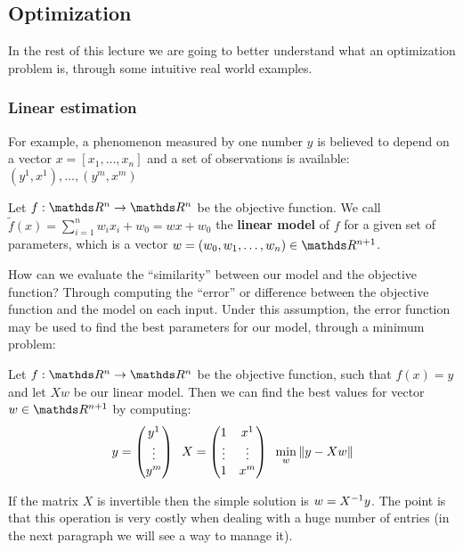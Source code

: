 \documentclass[ComputationalMathematics.tex]{subfiles}
\begin{document}
\subsection{Optimization}

In the rest of this lecture we are going to better understand what an optimization problem is, through some intuitive real world examples.

\subsubsection{Linear estimation}
For example, a phenomenon measured by one number $y$ is believed to depend on a vector $x = [x_1, \dots, x_n]$ and a set of observations is available: $(y^1,x^1), \dots, (y^m,x^m)$ 
\begin{definition}
  Let $f: \R^n \to \R^n$ be the objective function. We call $\widetilde{f}(x) = \sum_{i = 1}^n w_i x_i + w_0 = w x + w_0$ the \textbf{linear model} of $f$ for a given set of parameters, which is a vector $w = (w_0, w_1, \ldots, w_n) \in \R^{n+1}$.
\end{definition}

How can we evaluate the ``similarity'' between our model and the objective function? Through computing the ``error'' or difference between the objective function and the model on each input.
Under this assumption, the error function may be used to find the best parameters for our model, through a minimum problem:

\begin{definition}
  Let $f: \R^n \to \R^n$ be the objective function, such that $f(x) = y$ and let $Xw$ be our linear model. Then we can find the best values for vector $w \in \R^{n+1}$ by computing:
\[
  y = \begin{pmatrix} y^1\\ \vdots\\ y^m \end{pmatrix} \; \; X = \begin{pmatrix} 1 & x^1\\ \vdots & \vdots\\ 1 & x^m \end{pmatrix}\; \; \min_{w} \left\lVert y - X w\right\rVert
\]
\end{definition}

If the matrix $X$ is invertible then the simple solution is $w = {X}^{-1}y$.
The point is that this operation is very costly when dealing with a huge number of entries (in the next paragraph we will see a way to manage it).
\end{document}
